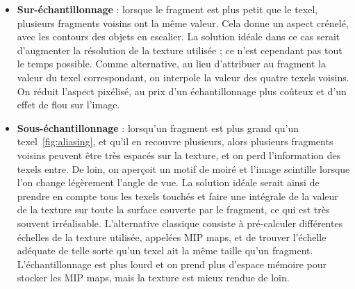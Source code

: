 \begin{itemize}
    \item \textbf{Sur-échantillonnage} : lorsque le fragment est plus petit que le texel, plusieurs fragments voisins ont la même valeur. Cela donne un aspect crénelé, avec les contours des objets en escalier. La solution idéale dans ce cas serait d'augmenter la résolution de la texture utilisée ; ce n'est cependant pas tout le temps possible. Comme alternative, au lieu d'attribuer au fragment la valeur du texel correspondant, on interpole la valeur des quatre texels voisins. On réduit l'aspect pixélisé, au prix d'un échantillonnage plus coûteux et d'un effet de flou sur l'image.
    \item \textbf{Sous-échantillonnage} : lorsqu'un fragment est plus grand qu'un texel~\ref{fig:aliasing}, et qu'il en recouvre plusieurs, alors plusieurs fragments voisins peuvent être très espacés sur la texture, et on perd l'information des texels entre. De loin, on aperçoit un motif de moiré et l'image scintille lorsque l'on change légèrement l'angle de vue. La solution idéale serait ainsi de prendre en compte tous les texels touchés et faire une intégrale de la valeur de la texture sur toute la surface couverte par le fragment, ce qui est très souvent irréalisable. L'alternative classique consiste à pré-calculer différentes échelles de la texture utilisée, appelées MIP maps, et de trouver l'échelle adéquate de telle sorte qu'un texel ait la même taille qu'un fragment. L'échantillonnage est plus lourd et on prend plus d'espace mémoire pour stocker les MIP maps, mais la texture est mieux rendue de loin.
\end{itemize}


